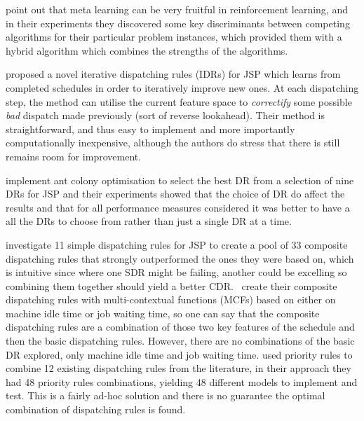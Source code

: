 \documentclass[smallextended]{svjour3}
\begin{document}
\citet{Kalyanakrishnan11} point out that meta learning can be very fruitful in reinforcement learning, and in their experiments they discovered some key discriminants between competing algorithms for their particular problem instances, which provided them with a hybrid algorithm which combines the strengths of the algorithms.

\citet{Nguyen13} proposed a novel iterative dispatching rules (IDRs) for JSP which learns from completed schedules in order to iteratively improve new ones. At each dispatching step, the method can utilise the current feature space to \emph{correctify} some possible \emph{bad} dispatch made previously (sort of reverse lookahead).
Their method is straightforward, and thus easy to implement and more importantly computationally inexpensive, although the authors do stress that there is still remains room for improvement. 

\citet{Korytkowski13} implement ant colony optimisation to select the best DR from a selection of nine DRs for JSP and their experiments showed that the choice of DR do affect the results and that for all performance measures considered it was better to have a all the DRs to choose from rather than just a single DR at a time. 

\citet{Lu13} investigate 11 simple dispatching rules for JSP to create a pool of 33 composite dispatching rules that strongly outperformed the ones they were based on, which is intuitive since where one SDR might be failing, another could be excelling so combining them together should yield a better CDR.~\citet{Lu13} create their composite dispatching rules with multi-contextual functions (MCFs) based on either on machine idle time or job waiting time, so one can say that the composite dispatching rules are a combination of those two key features of the schedule and then the basic dispatching rules. However, there are no combinations of the basic DR explored, only machine idle time and job waiting time.  
\citet{Yu13} used priority rules to combine 12 existing dispatching rules from the literature, in their approach they had 48 priority rules combinations, yielding 48 different models to implement and test. This is a fairly ad-hoc solution and there is no guarantee the optimal combination of dispatching rules is found. 


\end{document}

